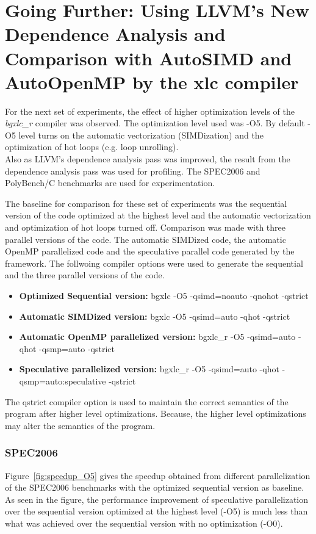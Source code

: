 \documentclass[10pt]{report}          %
\begin{document}
\section{Going Further: Using LLVM's New Dependence Analysis and Comparison with AutoSIMD and AutoOpenMP by the xlc compiler}

For the next set of experiments, the effect of higher optimization levels of the \textit{bgxlc\_r} compiler was observed.  The optimization level used was -O5.  By default -O5 level turns on the automatic vectorization (SIMDization) and the optimization of hot loops (e.g. loop unrolling).  \\

Also as LLVM's dependence analysis pass was improved, the result from the dependence analysis pass was used for profiling.  The SPEC2006 and PolyBench/C benchmarks are used for experimentation.

The baseline for comparison for these set of experiments was the sequential version of the code optimized at the highest level and the automatic vectorization and optimization of hot loops turned off.  Comparison was made with three parallel versions of the code.  The automatic SIMDized code, the automatic OpenMP parallelized code and the speculative parallel code generated by the framework.  The follwoing compiler options were used to generate the sequential and the three parallel versions of the code. \\

\begin{itemize}
\item \textbf{Optimized Sequential version:} bgxlc -O5 -qsimd=noauto -qnohot -qstrict 
\item \textbf{Automatic SIMDized version:} bgxlc -O5 -qsimd=auto -qhot -qstrict 
\item \textbf{Automatic OpenMP parallelized version:} bgxlc\_r -O5 -qsimd=auto -qhot -qsmp=auto -qstrict 
\item \textbf{Speculative parallelized version:} bgxlc\_r -O5 -qsimd=auto -qhot -qsmp=auto:speculative -qstrict
\end{itemize}

The \-qstrict compiler option is used to maintain the correct semantics of the program after higher level optimizations.  Because, the higher level optimizations may alter the semantics of the program. \\

\subsubsection{SPEC2006}
Figure~\ref{fig:speedup_O5} gives the speedup obtained from different parallelization of the SPEC2006 benchmarks with the optimized sequential version as baseline. As seen in the figure, the performance improvement of speculative parallelization over the sequential version optimized at the highest level (-O5) is much less than what was achieved over the sequential version with no optimization (-O0). \\
\end{document}
